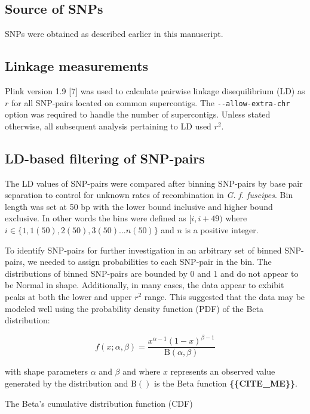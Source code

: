\documentclass[letterpaper]{scrartcl}
\begin{document}
\subsection{Source of SNPs}\label{source-of-snps}

SNPs were obtained as described earlier in this manuscript.

\subsection{Linkage measurements}\label{linkage-measurements}

Plink version 1.9 {[}7{]} was used to calculate pairwise linkage
disequilibrium (LD) as \(r\) for all SNP-pairs located on common
supercontigs. The \texttt{-\/-allow-extra-chr} option was required to
handle the number of supercontigs. Unless stated otherwise, all
subsequent analysis pertaining to LD used \(r^2\).

\subsection{LD-based filtering of
SNP-pairs}\label{ld-based-filtering-of-snp-pairs}

The LD values of SNP-pairs were compared after binning SNP-pairs by base
pair separation to control for unknown rates of recombination in
\emph{G. f. fuscipes}. Bin length was set at 50 bp with the lower bound
inclusive and higher bound exclusive. In other words the bins were
defined as \([i, i + 49)\) where
\(i \in \{1,1(50),2(50),3(50) ... n(50)\}\) and \(n\) is a positive
integer.

To identify SNP-pairs for further investigation in an arbitrary set of
binned SNP-pairs, we needed to assign probabilities to each SNP-pair in
the bin. The distributions of binned SNP-pairs are bounded by 0 and 1
and do not appear to be Normal in shape. Additionally, in many cases,
the data appear to exhibit peaks at both the lower and upper \(r^2\)
range. This suggested that the data may be modeled well using the
probability density function (PDF) of the Beta distribution:

\[f(x;\alpha,\beta) = \frac{x^{\alpha-1}(1-x)^{\beta-1}} {\mathrm{B}(\alpha,\beta)}\]

with shape parameters \(\alpha\) and \(\beta\) and where \(x\)
represents an observed value generated by the distribution and
\(\mathrm{B}()\) is the Beta function \textbf{\{\{CITE\_ME\}\}}.

The Beta's cumulative distribution function (CDF)
\end{document}
